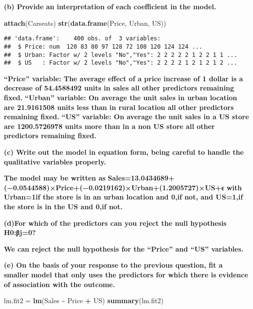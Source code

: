 \documentclass[
]{article}
\newenvironment{Shaded}{\begin{snugshade}}{\end{snugshade}}
\newcommand{\FunctionTok}[1]{\textcolor[rgb]{0.13,0.29,0.53}{\textbf{#1}}}
\newcommand{\NormalTok}[1]{#1}
\newcommand{\OtherTok}[1]{\textcolor[rgb]{0.56,0.35,0.01}{#1}}
\newcommand{\SpecialCharTok}[1]{\textcolor[rgb]{0.81,0.36,0.00}{\textbf{#1}}}
\begin{document}
\textbf{(b) Provide an interpretation of each coefficient in the model.}

\begin{Shaded}
\begin{Highlighting}[]
\FunctionTok{attach}\NormalTok{(Carseats)}
\FunctionTok{str}\NormalTok{(}\FunctionTok{data.frame}\NormalTok{(Price, Urban, US))}
\end{Highlighting}
\end{Shaded}

\begin{verbatim}
## 'data.frame':    400 obs. of  3 variables:
##  $ Price: num  120 83 80 97 128 72 108 120 124 124 ...
##  $ Urban: Factor w/ 2 levels "No","Yes": 2 2 2 2 2 1 2 2 1 1 ...
##  $ US   : Factor w/ 2 levels "No","Yes": 2 2 2 2 1 2 1 2 1 2 ...
\end{verbatim}

\textbf{``Price'' variable: The average effect of a price increase of 1
dollar is a decrease of 54.4588492 units in sales all other predictors
remaining fixed.} \textbf{``Urban'' variable: On average the unit sales
in urban location are 21.9161508 units less than in rural location all
other predictors remaining fixed.} \textbf{``US'' variable: On average
the unit sales in a US store are 1200.5726978 units more than in a non
US store all other predictors remaining fixed.}

\textbf{(c) Write out the model in equation form, being careful to
handle the qualitative variables properly.}

\textbf{The model may be written as}
\textbf{Sales=13.0434689+(−0.0544588)×Price+(−0.0219162)×Urban+(1.2005727)×US+ε}
\textbf{with Urban=1if the store is in an urban location and 0,if not,
and US=1,if the store is in the US and 0,if not.}

\textbf{(d)For which of the predictors can you reject the null
hypothesis H0:βj=0?}

\textbf{We can reject the null hypothesis for the ``Price'' and ``US''
variables.}

\textbf{(e) On the basis of your response to the previous question, fit
a smaller model that only uses the predictors for which there is
evidence of association with the outcome.}

\begin{Shaded}
\begin{Highlighting}[]
\NormalTok{lm.fit2 }\OtherTok{=} \FunctionTok{lm}\NormalTok{(Sales }\SpecialCharTok{\textasciitilde{}}\NormalTok{ Price }\SpecialCharTok{+}\NormalTok{ US)}
\FunctionTok{summary}\NormalTok{(lm.fit2)}
\end{Highlighting}
\end{Shaded}
\end{document}
